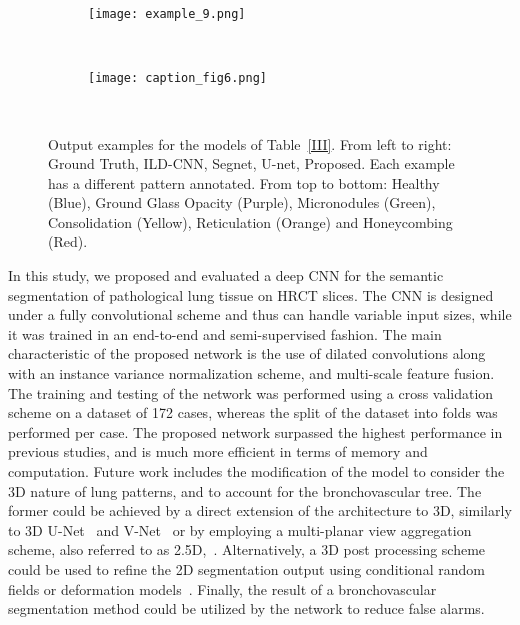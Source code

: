 \documentclass[journal]{IEEEtran}
\begin{document}
\begin{figure*}
    \begin{subfigure}[b]{1\textwidth}
    	\centering
        \texttt{[image: example\_9.png]}
    \end{subfigure}
    ~
    
    \begin{subfigure}[b]{1\textwidth}
    	\centering
        \texttt{[image: caption\_fig6.png]}
    \end{subfigure}
    ~
    
    \caption{Output examples for the models of Table~\ref{III}. From left to right: Ground Truth, ILD-CNN, Segnet, U-net, Proposed. Each example has a different pattern annotated. From top to bottom: Healthy (Blue), Ground Glass Opacity (Purple), Micronodules (Green), Consolidation (Yellow), Reticulation (Orange) and Honeycombing (Red).}
    \label{fig:examples}
\end{figure*}%
In this study, we proposed and evaluated a deep CNN for the semantic segmentation of pathological lung tissue on HRCT slices. The CNN is designed under a fully convolutional scheme and thus can handle variable input sizes, while it was trained in an end-to-end and semi-supervised fashion. The main characteristic of the proposed network is the use of dilated convolutions along with an instance variance normalization scheme, and multi-scale feature fusion. The training and testing of the network was performed using a cross validation scheme on a dataset of 172 cases, whereas the split of the dataset into folds was performed per case. The proposed network surpassed the highest performance in previous studies, and is much more efficient in terms of memory and computation. Future work includes the modification of the model to consider the 3D nature of lung patterns, and to account for the bronchovascular tree. The former could be achieved by a direct extension of the architecture to 3D, similarly to 3D U-Net~\cite{cciccek20163d} and V-Net~\cite{milletari2016v} or by employing a multi-planar view aggregation scheme, also referred to as 2.5D,~\cite{roth2016improving}. Alternatively, a 3D post processing scheme could be used to refine the 2D segmentation output using conditional random fields or deformation models~\cite{liu2018deep, christ2016automatic, kamnitsas2017efficient}. Finally, the result of a bronchovascular segmentation method could be utilized by the network to reduce false alarms.
\end{document}
